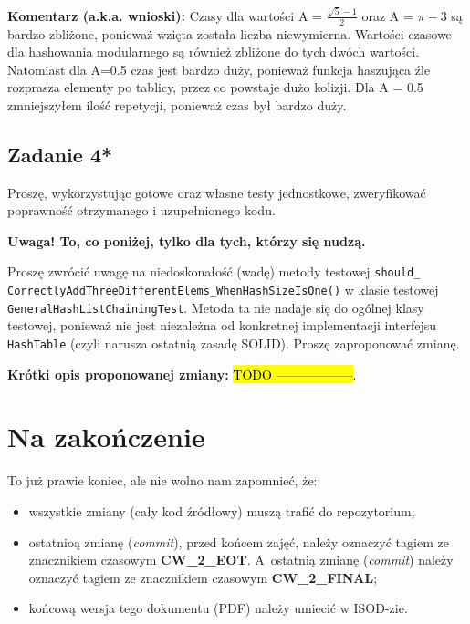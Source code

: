 \documentclass[twoside]{article}
\begin{document}
\noindent \textbf{Komentarz (a.k.a. wnioski):}
Czasy dla wartości A = $\frac{\sqrt{5}-1}{2}$ oraz A = $\pi-3$ są bardzo zbliżone,
ponieważ wzięta została liczba niewymierna. Wartości czasowe dla hashowania
modularnego są również zbliżone do tych dwóch wartości. Natomiast dla A=0.5
czas jest bardzo duży, ponieważ funkcja haszująca źle rozprasza elementy po
tablicy, przez co powstaje dużo kolizji. Dla A = 0.5 zmniejszyłem ilość
repetycji, ponieważ czas był bardzo duży.

\subsection{Zadanie 4*}
Proszę, wykorzystując gotowe oraz własne testy jednostkowe, zweryfikować poprawność
otrzymanego i uzupełnionego kodu.

\noindent \textbf{Uwaga! To, co poniżej, tylko dla tych, którzy się nudzą.}

Proszę zwrócić uwagę na niedoskonałość (wadę) metody testowej
\verb|should_| \verb|CorrectlyAddThreeDifferentElems_WhenHashSizeIsOne()|
w klasie testowej \verb|GeneralHashListChainingTest|. Metoda ta nie nadaje się do ogólnej klasy testowej, ponieważ nie jest niezależna od konkretnej implementacji interfejsu \verb|HashTable|
(czyli narusza ostatnią zasadę SOLID). Proszę zaproponować zmianę.

\noindent \textbf{Krótki opis proponowanej zmiany:} \hl{TODO ------------------}.

\section{Na zakończenie}
To już prawie koniec, ale nie wolno nam zapomnieć, że:
\begin{itemize}
    \item wszystkie zmiany (cały kod źródłowy) muszą trafić do repozytorium;
    \item ostatnioą zmianę (\textit{commit}), przed końcem zajęć, należy oznaczyć tagiem ze znacznikiem czasowym \textbf{CW\_2\_EOT}.
    A~ostatnią zmianę (\textit{commit}) należy oznaczyć tagiem ze znacznikiem czasowym \textbf{CW\_2\_FINAL};
    \item końcową wersja tego dokumentu (PDF) należy umiecić w ISOD-zie.
\end{itemize}
\end{document}
